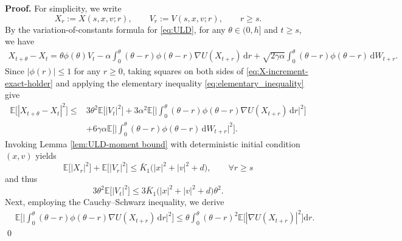 \documentclass[12pt]{article}
\numberwithin{equation}{section}
\renewenvironment{proof}%
  {\begin{trivlist}%
   \item[]\ignorespaces}%
  {\qed\end{trivlist}}
\newcommand{\dd}{\mathrm{d}}
\begin{document}
\begin{proof}
\textbf{Proof.}
For simplicity, we write
\[
X_r:=X(s,x,v;r),
\qquad
V_r:=V(s,x,v;r),
\qquad r\geq s.
\]
By the variation-of-constants formula for \eqref{eq:ULD}, for any $\theta\in(0,h]$ and $t\geq s$, we have
\begin{equation}
\label{eq:X-increment-exact-holder}
\begin{aligned}
X_{t+\theta}
-
X_t
=
\theta\phi(\theta)V_t
-
\alpha
\int_0^\theta
(\theta-r)\phi(\theta-r)
\nabla U(X_{t+r})\,\dd r
+
\sqrt{2\gamma\alpha}
\int_0^\theta
(\theta-r)\phi(\theta-r)\,\dd W_{t+r}.
\end{aligned}
\end{equation}
Since $|\phi(r)|\leq1$ for any $r\geq0$, taking squares on both sides of \eqref{eq:X-increment-exact-holder} and applying the elementary inequality \eqref{eq:elementary_inequality}
give
\begin{equation}
\label{eq:X-increment-split-exact}
\begin{aligned}
\mathbb E
\Big[
|X_{t+\theta}-X_t|^2
\Big]
\leq&
3\theta^2
\mathbb E
\Big[
|V_t|^2
\Big]
+
3\alpha^2
\mathbb E
\Big[
\Big|
\int_0^\theta
(\theta-r)\phi(\theta-r)
\nabla U(X_{t+r})\,\dd r
\Big|^2
\Big]
\\
&+
6\gamma\alpha
\mathbb E
\Big[
\Big|
\int_0^\theta
(\theta-r)\phi(\theta-r)\,\dd W_{t+r}
\Big|^2
\Big].
\end{aligned}
\end{equation}
Invoking Lemma \ref{lem:ULD-moment bound} with deterministic initial condition $(x,v)$ yields
\begin{equation}
\label{eq:ULD-moment-used-holder}
\mathbb E
\Big[
|X_r|^2
\Big]
+
\mathbb E
\Big[
|V_r|^2
\Big]
\leq
\bar K_1
\big(
|x|^2+|v|^2+d
\big),
\qquad
\forall r\geq s
\end{equation}
and thus
\begin{equation}
\label{eq:velocity-contribution-holder}
3\theta^2
\mathbb E
\Big[
|V_t|^2
\Big]
\leq
3\bar K_1
\big(
|x|^2+|v|^2+d
\big)\theta^2
.
\end{equation}
Next, employing the Cauchy--Schwarz inequality, we derive
\begin{equation}
\label{eq:drift-contribution-holder-1}
\begin{aligned}
&
\mathbb E
\Big[
\Big|
\int_0^\theta
(\theta-r)\phi(\theta-r)
\nabla U(X_{t+r})\,\dd r
\Big|^2
\Big]
\leq
\theta
\int_0^\theta
(\theta-r)^2
\mathbb E
\Big[
|\nabla U(X_{t+r})|^2
\Big]\dd r .
\end{aligned}

\end{equation}
\end{proof}
\end{document}
